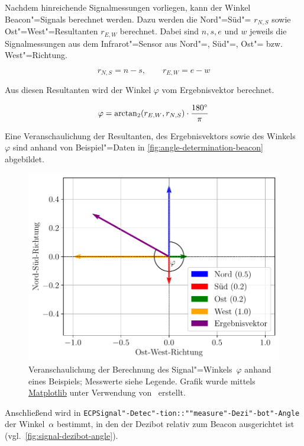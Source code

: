 {Nachdem hinreichende Signalmessungen vorliegen, kann der Winkel Beacon"=Signals berechnet werden. Dazu werden die Nord"=Süd"= $r_{N,S}$ sowie Ost"=West"=Resultanten $r_{E,W}$ berechnet. Dabei sind $n,s,e$ und $w$ jeweils die Signalmessungen aus dem Infrarot"=Sensor aus Nord"=, Süd"=, Ost"= bzw. West"=Richtung.

\begin{equation*}
    r_{N,S} = n - s, \qquad r_{E,W} = e - w
\end{equation*}

Aus diesen Resultanten wird der Winkel $\varphi$ vom Ergebnisvektor berechnet.

\begin{equation*}
    \varphi = \arctan_2(r_{E,W}, r_{N,S}) \cdot \frac{180^\circ}{\pi}
\end{equation*}

Eine Veranschaulichung der Resultanten, des Ergebnisvektors sowie des Winkels~$\varphi$ sind anhand von Beispiel"=Daten in \autoref{fig:angle-determination-beacon} abgebildet.

\begin{figure}[h]
    \includegraphics[width=\textwidth]{../plot/signal_direction.pdf}
    \caption{Veranschaulichung der Berechnung des Signal"=Winkels~$\varphi$ anhand eines Beispiels; Messwerte siehe Legende. Grafik wurde mittels \href{https://matplotlib.org/}{Matplotlib} unter Verwendung von~\cite{matplotlibdevelopmentteamScaleInvariantAngle} erstellt.}
    \label{fig:angle-determination-beacon}
\end{figure}

Anschließend wird in \texttt{ECPSignal"-Detec"-tion::""measure"-Dezi"-bot"-Angle} der Winkel~$\alpha$ bestimmt, in den der Dezibot relativ zum Beacon ausgerichtet ist (vgl.~\autoref{fig:signal-dezibot-angle}).

}
